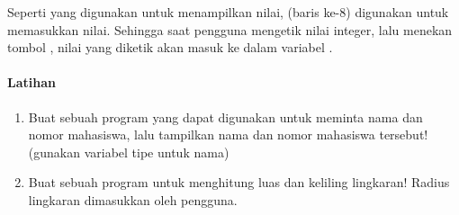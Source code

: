 \documentclass[../main.tex]{subfiles}
\begin{document}

Seperti  yang digunakan untuk menampilkan nilai, 
(baris ke-8) digunakan untuk memasukkan nilai. Sehingga saat pengguna mengetik
nilai integer, lalu menekan tombol , nilai yang diketik akan masuk
ke dalam variabel .

\paragraph{Latihan}
\begin{enumerate}
  \item Buat sebuah program yang dapat digunakan untuk meminta nama dan nomor
  mahasiswa, lalu tampilkan nama dan nomor mahasiswa tersebut! (gunakan variabel
  tipe  untuk nama)
  \item Buat sebuah program untuk menghitung luas dan keliling lingkaran! Radius
  lingkaran dimasukkan oleh pengguna.
\end{enumerate}
\end{document}
